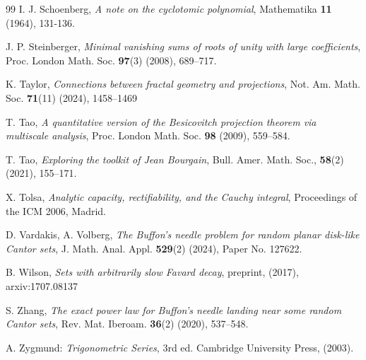 \documentclass[12pt]{amsart}
\numberwithin{equation}{section}
\begin{document}
\begin{thebibliography}{99}
I. J. Schoenberg, {\it A note on the cyclotomic polynomial}, Mathematika {\bf 11} (1964), 131-136.

 J. P. Steinberger, {\it Minimal vanishing sums of roots of unity with large coefficients},
Proc. London Math. Soc. {\bf 97}(3) (2008), 689--717.

 K. Taylor, {\it Connections between fractal geometry and projections}, Not. Am. Math. Soc. {\bf 71}(11) (2024), 1458--1469

 T. Tao, {\it A quantitative version of the Besicovitch projection
theorem via multiscale analysis},  Proc. London Math. Soc. {\bf 98} (2009), 559--584.

 T. Tao, {\it Exploring the toolkit of Jean Bourgain}, Bull. Amer. Math. Soc., {\bf 58}(2) (2021), 155--171.

 X. Tolsa, {\it Analytic capacity, rectifiability, and the Cauchy integral}, Proceedings of the ICM 2006, Madrid.

 D. Vardakis, A. Volberg, {\it The Buffon's needle problem for random planar disk-like Cantor sets}, J. Math. Anal. Appl. {\bf 529}(2) (2024), Paper No. 127622. 

 B. Wilson, {\it Sets with arbitrarily slow Favard decay}, preprint, (2017), arxiv:1707.08137

 S. Zhang, {\it The exact power law for Buffon's needle landing near some random Cantor sets}, Rev. Mat. Iberoam. {\bf 36}(2) (2020), 537--548.

 A. Zygmund: {\it Trigonometric Series}, 3rd ed. Cambridge University Press, (2003).
 
\end{thebibliography}
\end{document}
